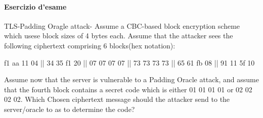 \documentclass{article}
\theoremstyle{remark}
\begin{document}
\paragraph{Esercizio d'esame}
TLS-Padding Oragle attack- Assume a CBC-based block encryption scheme which usese block sizes of 4 bytes each. Assume that the attacker sees the following ciphertext comprising 6 blocks(hex notation): \begin{center}
	f1 aa 11 04 || 34 35 f1 20 || 07 07 07 07 || 73 73 73 73 || 65 61 fb 08 || 91 11 5f 10
\end{center}
Assume now that the server is vulnerable to a Padding Oracle attack, and assume that the fourth block contains a secret code which is either 01 01 01 01 or 02 02 02 02. Which Chosen ciphertext message should the attacker send to the server/oracle to as to determine the code?\newline
\end{document}
